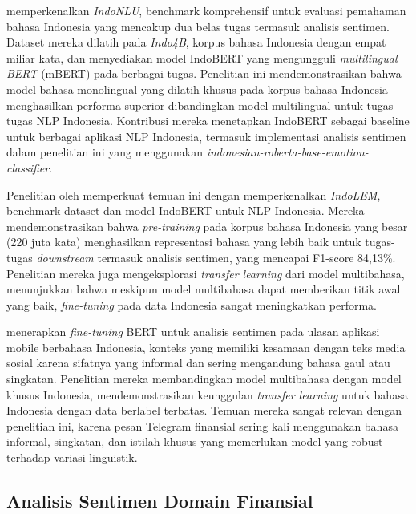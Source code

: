 \textcite{wilie2020} memperkenalkan \textit{IndoNLU}, benchmark komprehensif untuk evaluasi pemahaman bahasa Indonesia yang mencakup dua belas tugas termasuk analisis sentimen. Dataset mereka dilatih pada \textit{Indo4B}, korpus bahasa Indonesia dengan empat miliar kata, dan menyediakan model IndoBERT yang mengungguli \textit{multilingual BERT} (mBERT) pada berbagai tugas. Penelitian ini mendemonstrasikan bahwa model bahasa monolingual yang dilatih khusus pada korpus bahasa Indonesia menghasilkan performa superior dibandingkan model multilingual untuk tugas-tugas NLP Indonesia. Kontribusi mereka menetapkan IndoBERT sebagai baseline untuk berbagai aplikasi NLP Indonesia, termasuk implementasi analisis sentimen dalam penelitian ini yang menggunakan \textit{indonesian-roberta-base-emotion-classifier}.

Penelitian oleh \textcite{koto2020} memperkuat temuan ini dengan memperkenalkan \textit{IndoLEM}, benchmark dataset dan model IndoBERT untuk NLP Indonesia. Mereka mendemonstrasikan bahwa \textit{pre-training} pada korpus bahasa Indonesia yang besar (220 juta kata) menghasilkan representasi bahasa yang lebih baik untuk tugas-tugas \textit{downstream} termasuk analisis sentimen, yang mencapai F1-score 84,13\%. Penelitian mereka juga mengeksplorasi \textit{transfer learning} dari model multibahasa, menunjukkan bahwa meskipun model multibahasa dapat memberikan titik awal yang baik, \textit{fine-tuning} pada data Indonesia sangat meningkatkan performa.

\textcite{nugroho2021} menerapkan \textit{fine-tuning} BERT untuk analisis sentimen pada ulasan aplikasi mobile berbahasa Indonesia, konteks yang memiliki kesamaan dengan teks media sosial karena sifatnya yang informal dan sering mengandung bahasa gaul atau singkatan. Penelitian mereka membandingkan model multibahasa dengan model khusus Indonesia, mendemonstrasikan keunggulan \textit{transfer learning} untuk bahasa Indonesia dengan data berlabel terbatas. Temuan mereka sangat relevan dengan penelitian ini, karena pesan Telegram finansial sering kali menggunakan bahasa informal, singkatan, dan istilah khusus yang memerlukan model yang robust terhadap variasi linguistik.

\subsection{Analisis Sentimen Domain Finansial}

